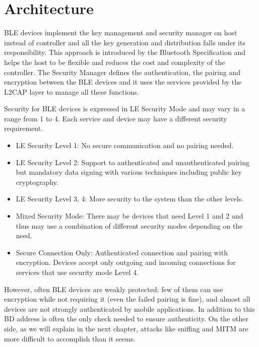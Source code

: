 \section{Architecture}
BLE devices implement the key management and security manager on host instead of controller and all the key generation and distribution falls under its responsibility.
This approach is introduced by the Bluetooth Specification and helps the host to be flexible and reduces the cost and complexity of the controller.
The Security Manager defines the authentication, the pairing and encryption between the BLE devices and it uses the services provided by the L2CAP layer to manage all these functions.

Security for BLE devices is expressed in LE Security Mode and may vary in a range from 1 to 4.
Each service and device may have a different security requirement.
\begin{itemize}
	\item LE Security Level 1: No secure communication and no pairing needed.
	\item LE Security Level 2: Support to authenticated and unauthenticated pairing but mandatory data signing with various techniques including public key cryptography.
	\item LE Security Level 3, 4: More security to the system than the other levels.
	\item Mixed Security Mode: There may be devices that need Level 1 and 2 and thus may use a combination of different security modes depending on the need.
	\item Secure Connection Only: Authenticated connection and pairing with encryption. Devices accept only outgoing and incoming connections for services that use security mode Level 4.
\end{itemize}

However, often BLE devices are weakly protected: few of them can use encryption while not requiring it (even the failed pairing is fine), and almost all devices are not strongly authenticated by mobile applications.
In addition to this BD address is often the only check needed to ensure authenticity. On the other side, as we will explain in the next chapter, attacks like sniffing and MITM are more difficult to accomplish than it seems.


